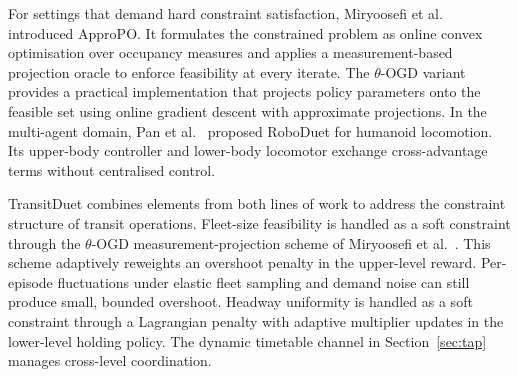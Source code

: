 For settings that demand hard constraint satisfaction, Miryoosefi et al.~\citep{miryoosefi2019reinforcement} introduced ApproPO. It formulates the constrained problem as online convex optimisation over occupancy measures and applies a measurement-based projection oracle to enforce feasibility at every iterate. The $\theta$-OGD variant provides a practical implementation that projects policy parameters onto the feasible set using online gradient descent with approximate projections. In the multi-agent domain, Pan et al.~\citep{pan2024roboduet} proposed RoboDuet for humanoid locomotion. Its upper-body controller and lower-body locomotor exchange cross-advantage terms without centralised control.

TransitDuet combines elements from both lines of work to address the constraint structure of transit operations. Fleet-size feasibility is handled as a soft constraint through the $\theta$-OGD measurement-projection scheme of Miryoosefi et al.~\citep{miryoosefi2019reinforcement}. This scheme adaptively reweights an overshoot penalty in the upper-level reward. Per-episode fluctuations under elastic fleet sampling and demand noise can still produce small, bounded overshoot. Headway uniformity is handled as a soft constraint through a Lagrangian penalty with adaptive multiplier updates in the lower-level holding policy. The dynamic timetable channel in Section~\ref{sec:tap} manages cross-level coordination.

